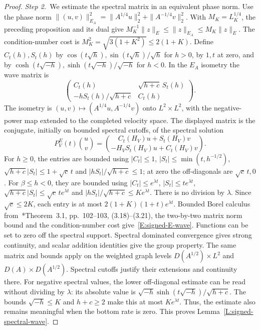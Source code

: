 \begin{proof}
  \medskip
  \noindent\textit{Step 2.~}We estimate the spectral matrix in an equivalent
  phase norm.
  Use the phase norm $\|(u,v)\|_{E_A}^2 = \|A^{1/4}u\|_2^2+\|A^{-1/4}v\|_2^2$.
  With $M_K = L_K^{1/4}$, the preceding proposition and its dual give
  $M_K^{-1}\|z\|_E \le \|z\|_{E_A} \le M_K\|z\|_E$. The condition-number cost is
  $M_K^2 = \sqrt{3(1+K^2)} \le 2(1+K)$. Define $C_t(h),S_t(h)$ by $\cos(t\sqrt
  h),\sin(t\sqrt h)/\sqrt h$ for $h > 0$, by $1,t$ at zero, and by
  $\cosh(t\sqrt{-h}),\sinh(t\sqrt{-h})/\sqrt{-h}$ for $h < 0$. In the $E_A$
  isometry the wave matrix is
  \begin{equation}\label{E:signed-spectral-matrix}
    \begin{pmatrix}
      C_t(h)&\sqrt{h+c}\,S_t(h)\\
      -hS_t(h)/\sqrt{h+c}&C_t(h)
    \end{pmatrix}.
  \end{equation}
  The isometry is $(u,v)\mapsto(A^{1/4}u,A^{-1/4}v)$ onto
  $L^2\times L^2$, with the negative-power map extended to the completed
  velocity space.
  The displayed matrix is the conjugate, initially on bounded spectral
  cutoffs, of the spectral solution
  \[
    P_V^E(t)\binom{u}{v}
    =\binom{C_t(H_V)u+S_t(H_V)v}
    {-H_VS_t(H_V)u+C_t(H_V)v}.
  \]
  For $h \ge 0$, the entries are bounded using $|C_t| \le 1$, $|S_t| \le
  \min(t,h^{-1/2})$, $\sqrt{h+c}|S_t| \le 1+\sqrt c\,t$ and $|hS_t|/\sqrt{h+c}
  \le 1$; at zero the off-diagonals are $\sqrt c\,t,0$. For $\beta \le h < 0$,
  they are bounded using $|C_t| \le e^{\lambda t}$, $|S_t| \le te^{\lambda t}$,
  $\sqrt{h+c}|S_t| \le \sqrt c\,te^{\lambda t}$ and $|hS_t|/\sqrt{h+c} \le
  Ke^{\lambda t}$. There is no division by $\lambda$. Since $\sqrt c \le 2K$,
  each entry is at most $2(1+K)(1+t)e^{\lambda t}$. Bounded Borel calculus
  from~\cite{teschl:14:mathematical}*{Theorem~3.1, pp.~102--103,
  (3.18)--(3.21)}, the two-by-two matrix norm bound and the condition-number
  cost give~\eqref{E:signed-E-wave}. Functions can be set to zero off the
  spectral support. Spectral dominated convergence gives strong continuity, and
  scalar addition identities give the group property. The same matrix and bounds
  apply on the weighted graph levels $D(A^{1/2})\times L^2$ and $D(A)\times
  D(A^{1/2})$. Spectral cutoffs justify their extensions and continuity there.
  For negative spectral values, the lower off-diagonal estimate can be read
  without dividing by $\lambda$: its absolute value is
  $\sqrt{-h}\sinh(t\sqrt{-h})/\sqrt{h+c}$. The bounds $\sqrt{-h}\le K$ and
  $h+c\ge2$ make this at most $Ke^{\lambda t}$. Thus, the estimate also
  remains meaningful when the bottom rate is zero.
  This proves Lemma~\ref{L:signed-spectral-wave}.
\end{proof}

